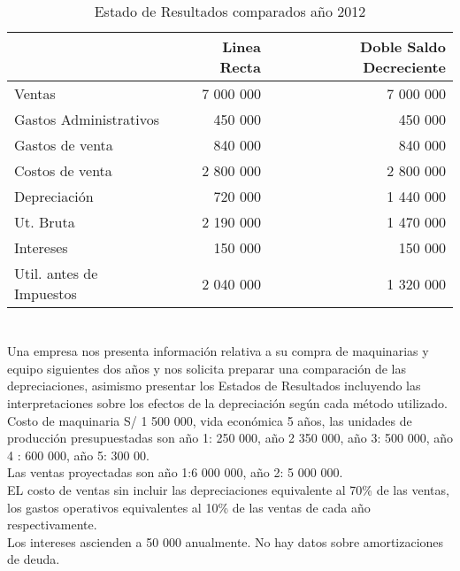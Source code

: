\documentclass[10pt,a4paper]{report}
\begin{document}
	\begin{table}[h!]
	\centering
	\caption{Estado de Resultados comparados año 2012}
	\begin{tabular}{l|r|r} 
	                          & Linea Recta & Doble Saldo Decreciente \\ \hline
	 Ventas                   & 7 000 000   & 7 000 000               \\
	 Gastos Administrativos   & 450 000     & 450 000                 \\
	 Gastos de venta          & 840 000     & 840 000                 \\
	 Costos de venta          & 2 800 000   & 2 800 000               \\
	 Depreciación             & 720 000     & 1 440 000               \\ \hline
	 Ut. Bruta                & 2 190 000   & 1 470 000               \\
	 Intereses                & 150 000     & 150 000                 \\ \hline
	 Util. antes de Impuestos & 2 040 000   & 1 320 000
 	\end{tabular}
	\end{table}	 
\newpage %
\chapter{}
Una empresa nos presenta información relativa a su compra de maquinarias y equipo siguientes dos años y nos solicita preparar una comparación de las depreciaciones, asimismo presentar los Estados de Resultados incluyendo las interpretaciones sobre los efectos de la depreciación según cada método utilizado.\\
Costo de maquinaria S/ 1 500 000, vida económica 5 años, las unidades de producción presupuestadas son año 1: 250 000, año 2 350 000, año 3: 500 000, año 4 : 600 000, año 5: 300 00.\\
Las ventas proyectadas son año 1:6 000 000, año 2: 5 000 000.\\

EL costo de ventas sin incluir las depreciaciones equivalente al 70\% de las ventas, los gastos operativos equivalentes  al 10\% de las ventas de cada año respectivamente.\\

Los intereses ascienden a 50 000 anualmente. No hay datos sobre amortizaciones de deuda.\\
\end{document}
